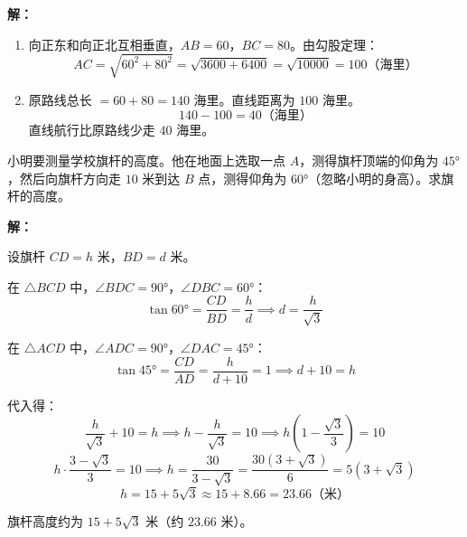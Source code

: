 \documentclass[12pt, a4paper]{ctexart}
\begin{document}
\textbf{解：}
\begin{enumerate}[label=(\arabic*)]
  \item 向正东和向正北互相垂直，$AB = 60$，$BC = 80$。由勾股定理：
  \[
  AC = \sqrt{60^2 + 80^2} = \sqrt{3600 + 6400} = \sqrt{10000} = 100 \text{（海里）}
  \]

  \item 原路线总长 $= 60 + 80 = 140$ 海里。直线距离为 $100$ 海里。
  \[
  140 - 100 = \boxed{40} \text{（海里）}
  \]
  直线航行比原路线少走 $40$ 海里。
\end{enumerate}

\vspace{6pt}

\begin{appbox}[【应用3】测量问题]
小明要测量学校旗杆的高度。他在地面上选取一点 $A$，测得旗杆顶端的仰角为 $45°$，然后向旗杆方向走 $10$ 米到达 $B$ 点，测得仰角为 $60°$（忽略小明的身高）。求旗杆的高度。

\begin{center}
\end{center}
\end{appbox}

\textbf{解：}

设旗杆 $CD = h$ 米，$BD = d$ 米。

在 $\triangle BCD$ 中，$\angle BDC = 90°$，$\angle DBC = 60°$：
\[
\tan 60° = \frac{CD}{BD} = \frac{h}{d} \implies d = \frac{h}{\sqrt{3}}
\]

在 $\triangle ACD$ 中，$\angle ADC = 90°$，$\angle DAC = 45°$：
\[
\tan 45° = \frac{CD}{AD} = \frac{h}{d+10} = 1 \implies d + 10 = h
\]

代入得：
\[
\frac{h}{\sqrt{3}} + 10 = h \implies h - \frac{h}{\sqrt{3}} = 10 \implies h\left(1 - \frac{\sqrt{3}}{3}\right) = 10
\]
\[
h \cdot \frac{3 - \sqrt{3}}{3} = 10 \implies h = \frac{30}{3 - \sqrt{3}} = \frac{30(3+\sqrt{3})}{6} = 5(3+\sqrt{3})
\]
\[
h = 15 + 5\sqrt{3} \approx 15 + 8.66 = 23.66 \text{（米）}
\]

旗杆高度约为 $\boxed{15 + 5\sqrt{3}}$ 米（约 $23.66$ 米）。
\end{document}
